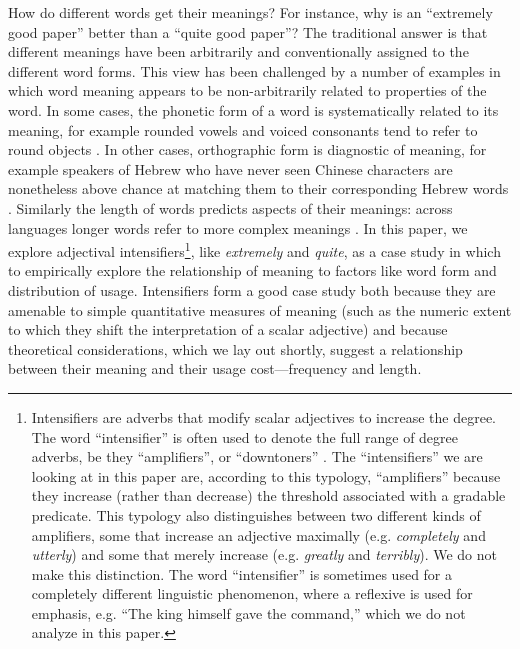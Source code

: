 \documentclass[10pt,letterpaper]{article}
\newcommand{\w}[1]{\emph{#1}}
\begin{document}
How do different words get their meanings?
For instance, why is an ``extremely good paper'' better than a ``quite good paper''? The traditional answer \cite{saussure} is that different meanings have been arbitrarily and conventionally assigned to the different word forms.
This view has been challenged by a number of examples in which word meaning appears to be non-arbitrarily related to properties of the word.
In some cases, the phonetic form of a word is systematically related to its meaning, for example rounded vowels and voiced consonants tend to refer to round objects \cite{maluma-takete, bouba-kiki, bouba-kiki2, takete-uloomo}. 
In other cases, orthographic form is diagnostic of meaning, for example speakers of Hebrew who have never seen Chinese characters are nonetheless above chance at matching them to their corresponding Hebrew words \cite{koriat}. 
Similarly the length of words predicts aspects of their meanings: across languages longer words refer to more complex meanings \cite{lewis}.
In this paper, we explore adjectival intensifiers\footnote{Intensifiers are adverbs that modify scalar adjectives to increase the degree. The word ``intensifier'' is often used to denote the full range of degree adverbs, be they ``amplifiers'', or ``downtoners'' \cite{quirk}. The ``intensifiers'' we are looking at in this paper are, according to this typology, ``amplifiers'' because they increase (rather than decrease) the threshold associated with a gradable predicate. This typology also distinguishes between two different kinds of amplifiers, some that increase an adjective maximally (e.g. \w{completely} and \w{utterly}) and some that merely increase (e.g. \w{greatly} and \w{terribly}). We do not make this distinction. The word ``intensifier'' is sometimes used for a completely different linguistic phenomenon, where a reflexive is used for emphasis, e.g. ``The king himself gave the command,'' which we do not analyze in this paper.}, like \w{extremely} and \w{quite},
as a case study in which to empirically explore the relationship of meaning to factors like word form and distribution of usage.
Intensifiers form a good case study both because they are amenable to simple quantitative measures of meaning (such as the numeric extent to which they shift the interpretation of a scalar adjective) and because theoretical considerations, which we lay out shortly, suggest a relationship between their meaning and their usage cost---frequency and length.
\end{document}
